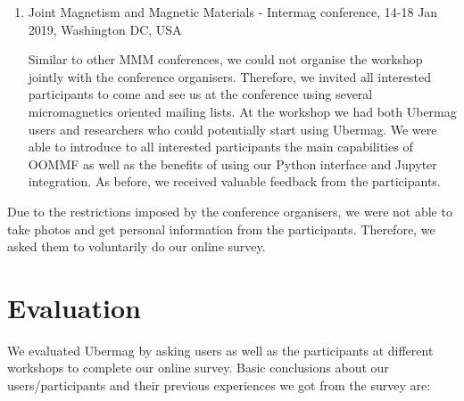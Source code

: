 \documentclass{deliverablereport}
\begin{document}
\begin{enumerate}
\item Joint Magnetism and Magnetic Materials - Intermag conference,
14-18 Jan 2019, Washington DC, USA

    Similar to other MMM conferences, we could not organise the
workshop jointly with the conference organisers. Therefore, we invited
all interested participants to come and see us at the conference using
several micromagnetics oriented mailing lists. At the workshop we had
both Ubermag users and researchers who could potentially start using
Ubermag. We were able to introduce to all interested participants the
main capabilities of OOMMF as well as the benefits of using our Python
interface and Jupyter integration. As before, we received valuable
feedback from the participants.

\end{enumerate}

Due to the restrictions imposed by the conference organisers, we were
not able to take photos and get personal information from the
participants. Therefore, we asked them to voluntarily do our online
survey.

\section{Evaluation}

We evaluated Ubermag by asking users as well as the participants at
different workshops to complete our online survey. Basic conclusions
about our users/participants and their previous experiences we got
from the survey are:
\end{document}
